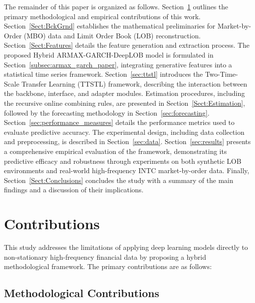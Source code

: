 \documentclass{rQUF2e}
\theoremstyle{plain}
\theoremstyle{definition}
\theoremstyle{remark}
\begin{document}
The remainder of this paper is organized as follows. Section~\ref{Sect:Contributions} outlines the primary methodological and empirical contributions of this work. Section~\ref{Sect:BckGrnd} establishes the mathematical preliminaries for Market-by-Order (MBO) data and Limit Order Book (LOB) reconstruction. Section~\ref{Sect:Features} details the feature generation and extraction process. The proposed Hybrid ARMAX-GARCH-DeepLOB model is formulated in Section~\ref{subsec:armax_garch_paper}, integrating generative features into a statistical time series framework. Section~\ref{sec:ttstl} introduces the Two-Time-Scale Transfer Learning (TTSTL) framework, describing the interaction between the backbone, interface, and adapter modules. Estimation procedures, including the recursive online combining rules, are presented in Section~\ref{Sect:Estimation}, followed by the forecasting methodology in Section~\ref{sec:forecasting}.
Section~\ref{sec:performance_measures} details the performance metrics used to evaluate predictive accuracy.
The experimental design, including data collection and preprocessing, is described in Section~\ref{sec:data}.
Section~\ref{sec:results} presents a comprehensive empirical evaluation of the framework, demonstrating its predictive efficacy and robustness through experiments on both synthetic LOB environments and real-world high-frequency INTC market-by-order data. Finally, Section~\ref{Sect:Conclusions} concludes the study with a summary of the main findings and a discussion of their implications.

\section{Contributions}
\label{Sect:Contributions}

This study addresses the limitations of applying deep learning models directly to non-stationary high-frequency financial data by proposing a hybrid methodological framework. The primary contributions are as follows:

\subsection{Methodological Contributions}
\end{document}
